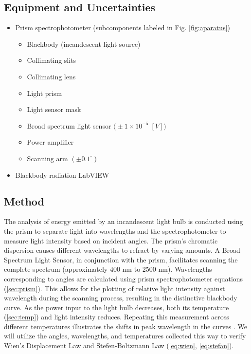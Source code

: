 \documentclass[12pt]{article}
\begin{document}
\subsection{Equipment and Uncertainties}
\begin{itemize}
    \item Prism spectrophotometer (subcomponents labeled in Fig. \ref{fig:aparatus})
    \begin{itemize}
        \item Blackbody (incandescent light source)
        \item Collimating slits
        \item Collimating lens
        \item Light prism
        \item Light sensor mask
        \item Broad spectrum light sensor $\big(\pm1\times10^{-5}\;[V]\big)$
        \item Power amplifier
        \item Scanning arm $(\pm0.1^\circ)$
    \end{itemize}
    \item Blackbody radiation LabVIEW
\end{itemize}

\subsection{Method}
The analysis of energy emitted by an incandescent light bulb is conducted using the prism to separate light into wavelengths and the spectrophotometer to measure light intensity based on incident angles. The prism's chromatic dispersion causes different wavelengths to refract by varying amounts. A Broad Spectrum Light Sensor, in conjunction with the prism, facilitates scanning the complete spectrum (approximately 400 nm to 2500 nm). Wavelengths corresponding to angles are calculated using prism spectrophotometer equations (\ref{sec:prism}). This allows for the plotting of relative light intensity against wavelength during the scanning process, resulting in the distinctive blackbody curve. As the power input to the light bulb decreases, both its temperature (\ref{sec:temp}) and light intensity reduces. Repeating this measurement across different temperatures illustrates the shifts in peak wavelength in the curves \autocite{manuall}. We will utilize the angles, wavelengths, and temperatures collected this way to verify Wien's Displacement Law and Stefen-Boltzmann Law (\ref{eq:wien}, \ref{eq:stefan}).
\end{document}
